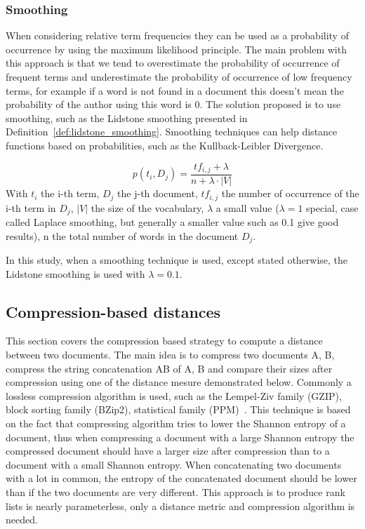 \subsubsection{Smoothing}

When considering relative term frequencies they can be used as a probability of occurrence by using the maximum likelihood principle.
The main problem with this approach is that we tend to overestimate the probability of occurrence of frequent terms and underestimate the probability of occurrence of low frequency terms, for example if a word is not found in a document this doesn't mean the probability of the author using this word is 0.
The solution proposed is to use smoothing, such as the Lidstone smoothing presented in Definition~\ref{def:lidstone_smoothing}.
Smoothing techniques can help distance functions based on probabilities, such as the Kullback-Leibler Divergence.

\begin{definition}
  \label{def:lidstone_smoothing}
  \begin{equation}
    p(t_i, D_j) = \frac{tf_{i,j} + \lambda}{n + \lambda \cdot |V|}
  \end{equation}
  With $t_i$ the i-th term, $D_j$ the j-th document, $tf_{i,j}$ the number of occurrence of the i-th term in $D_j$, $|V|$ the size of the vocabulary, $\lambda$ a small value ($\lambda = 1$ special, case called Laplace smoothing, but generally a smaller value such as 0.1 give good results), n the total number of words in the document $D_j$.
\end{definition}

In this study, when a smoothing technique is used, except stated otherwise, the Lidstone smoothing is used with $\lambda = 0.1$.

\subsection{Compression-based distances \label{sec:compression_based_distances}}

This section covers the compression based strategy to compute a distance between two documents.
The main idea is to compress two documents A, B, compress the string concatenation AB of A, B and compare their sizes after compression using one of the distance mesure demonstrated below.
Commonly a lossless compression algorithm is used, such as the Lempel-Ziv family (GZIP), block sorting family (BZip2), statistical family (PPM)~\cite{comparing_compression}.
This technique is based on the fact that compressing algorithm tries to lower the Shannon entropy of a document, thus when compressing a document with a large Shannon entropy the compressed document should have a larger size after compression than to a document with a small Shannon entropy.
When concatenating two documents with a lot in common, the entropy of the concatenated document should be lower than if the two documents are very different.
This approach is to produce rank lists is nearly parameterless, only a distance metric and compression algorithm is needed.

